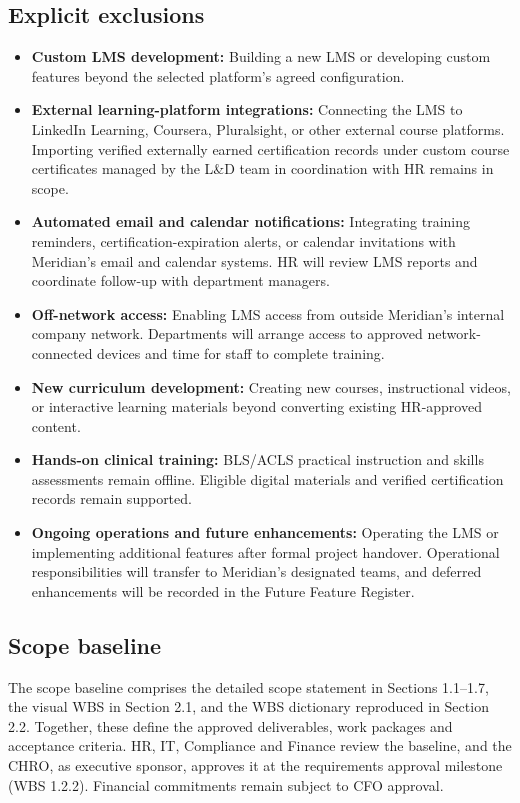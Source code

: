 \subsection{Explicit exclusions}\label{sec:1.7}
\begin{itemize}
\item \textbf{Custom LMS development:} Building a new LMS or developing custom features beyond the selected platform's agreed configuration.
\item \textbf{External learning-platform integrations:} Connecting the LMS to LinkedIn Learning, Coursera, Pluralsight, or other external course platforms. Importing verified externally earned certification records under custom course certificates managed by the L\&D team in coordination with HR remains in scope.
\item \textbf{Automated email and calendar notifications:} Integrating training reminders, certification-expiration alerts, or calendar invitations with Meridian's email and calendar systems. HR will review LMS reports and coordinate follow-up with department managers.
\item \textbf{Off-network access:} Enabling LMS access from outside Meridian's internal company network. Departments will arrange access to approved network-connected devices and time for staff to complete training.
\item \textbf{New curriculum development:} Creating new courses, instructional videos, or interactive learning materials beyond converting existing HR-approved content.
\item \textbf{Hands-on clinical training:} BLS/\allowbreak{}ACLS practical instruction and skills assessments remain offline. Eligible digital materials and verified certification records remain supported.
\item \textbf{Ongoing operations and future enhancements:} Operating the LMS or implementing additional features after formal project handover. Operational responsibilities will transfer to Meridian's designated teams, and deferred enhancements will be recorded in the Future Feature Register.
\end{itemize}


\subsection{Scope baseline}\label{sec:1.8}
The scope baseline comprises the detailed scope statement in Sections 1.1--1.7, the visual WBS in Section 2.1, and the WBS dictionary reproduced in Section 2.2. Together, these define the approved deliverables, work packages and acceptance criteria. HR, IT, Compliance and Finance review the baseline, and the CHRO, as executive sponsor, approves it at the requirements approval milestone (WBS 1.2.2). Financial commitments remain subject to CFO approval.


